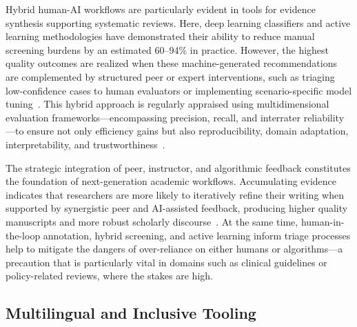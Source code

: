 \documentclass[sigconf]{acmart}
\begin{document}
Hybrid human-AI workflows are particularly evident in tools for evidence synthesis supporting systematic reviews. Here, deep learning classifiers and active learning methodologies have demonstrated their ability to reduce manual screening burdens by an estimated 60--94\% in practice. However, the highest quality outcomes are realized when these machine-generated recommendations are complemented by structured peer or expert interventions, such as triaging low-confidence cases to human evaluators or implementing scenario-specific model tuning~\cite{ref28,ref29,ref30,ref37,ref39,ref49,ref80,ref86,ref88,ref89,ref91,ref92,ref94,ref96,ref98,ref107,ref108}. This hybrid approach is regularly appraised using multidimensional evaluation frameworks—encompassing precision, recall, and interrater reliability—to ensure not only efficiency gains but also reproducibility, domain adaptation, interpretability, and trustworthiness~\cite{ref28,ref29,ref31,ref38,ref39,ref49,ref62,ref76,ref80,ref88,ref89,ref90,ref91,ref94,ref96,ref97,ref98,ref108}.

The strategic integration of peer, instructor, and algorithmic feedback constitutes the foundation of next-generation academic workflows. Accumulating evidence indicates that researchers are more likely to iteratively refine their writing when supported by synergistic peer and AI-assisted feedback, producing higher quality manuscripts and more robust scholarly discourse~\cite{ref88,ref89,ref91,ref92,ref96,ref98,ref107,ref108}. At the same time, human-in-the-loop annotation, hybrid screening, and active learning inform triage processes help to mitigate the dangers of over-reliance on either humans or algorithms—a precaution that is particularly vital in domains such as clinical guidelines or policy-related reviews, where the stakes are high.

\subsection{Multilingual and Inclusive Tooling}
\end{document}
